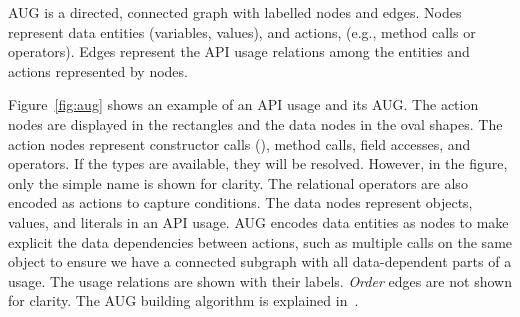 \begin{Definition}
AUG is a directed, connected graph with labelled nodes and
edges. Nodes represent data entities (variables, values), and actions,
(e.g., method calls or operators). Edges represent the API usage
relations
among the entities and actions represented by nodes.
\end{Definition}

Figure~\ref{fig:aug} shows an example of an API usage and its AUG.
The action nodes are displayed in the rectangles and the data nodes in
the oval shapes. The action nodes represent constructor calls
(), method calls, field accesses, and operators. If the
types are available, they will be resolved. However, in the figure,
only the simple name is shown for clarity. The relational operators
are also encoded as actions to capture conditions. The data nodes
represent objects, values, and literals in an API usage. AUG encodes
data entities as nodes to make explicit the data dependencies between
actions, such as multiple calls on the same object to ensure we have a
connected subgraph with all data-dependent parts of a usage. The usage
relations are shown with their labels. {\em Order} edges are not
shown for clarity. The AUG building algorithm is explained in~\cite{msr19}.
